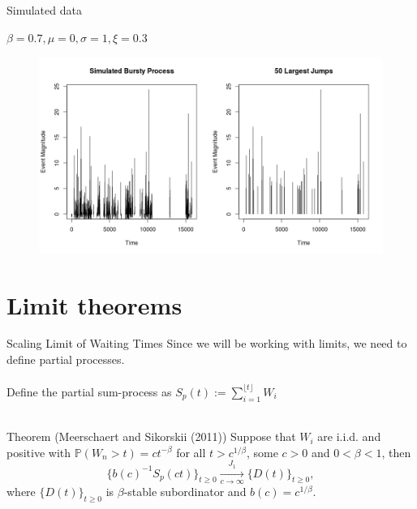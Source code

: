 \documentclass{beamer}
\newcommand{\Prob}{\mathbb{P}}
\begin{document}
\begin{frame}{Simulated data}
    \begin{center}
        $\beta=0.7, \mu=0, \sigma=1, \xi=0.3$
    \end{center}
	\begin{figure}
        \centering
        \vspace{-0.5cm}
        \hspace{-0.8cm}
        \includegraphics[scale=0.45]{SimulatedBursty.jpeg}
    \end{figure}
\end{frame}

\section{Limit theorems}

\begin{frame}{Scaling Limit of Waiting Times}
	Since we will be working with limits, we need to define partial processes.
	\\~\\
	Define the partial sum-process as $S_p(t):=\sum^{\lfloor{t}\rfloor}_{i=1} W_i$
	\\~\\
	\begin{block}{Theorem (Meerschaert and Sikorskii (2011))}
		Suppose that $W_i$ are i.i.d. and positive with $\Prob(W_n>t)=ct^{-\beta}$ for all $t>c^{1/\beta}$, some $c>0$ and $0<\beta<1$, then
		\[
		    \{b(c)^{-1}S_p(ct)\}_{t\geq0} \xrightarrow[c\to \infty]{J_1} \{D(t)\}_{t\geq0},
		\]
		where $\{D(t)\}_{t\geq0}$ is $\beta$-stable subordinator and $b(c)=c^{1/\beta}.$
	\end{block}
\end{frame}
\end{document}
